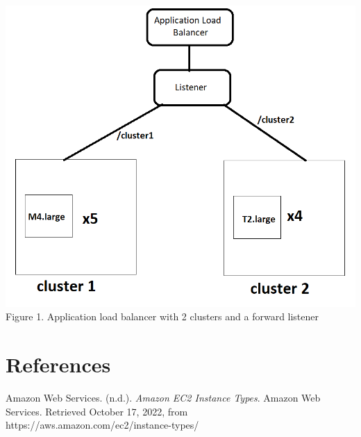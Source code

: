 \documentclass[11pt]{article}
\begin{document}
\begin{center}
    \includegraphics[scale=0.5]{cluster.png}\\
    Figure 1. Application load balancer with 2 clusters and a forward listener  
\end{center}

\section{References}
Amazon Web Services. (n.d.). {\it Amazon EC2 Instance Types}. Amazon Web Services. Retrieved October 17, 2022, from https://aws.amazon.com/ec2/instance-types/ 
\end{document}
